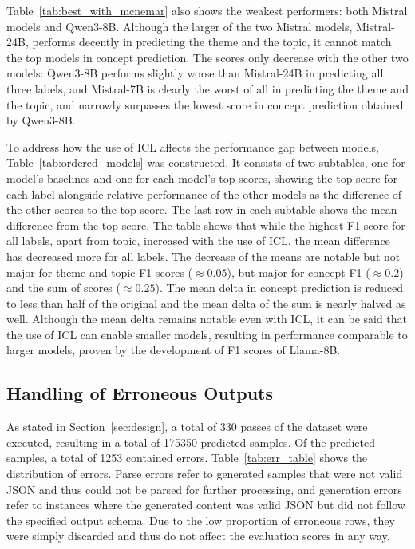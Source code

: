 \documentclass[english, 12pt, a4paper, sci, utf8, a-2b, online]{latex/definitions/aaltothesis}
\begin{document}
Table~\ref{tab:best_with_mcnemar} also shows the weakest performers: both Mistral models and Qwen3-8B. Although the larger of the two Mistral models, Mistral-24B, performs decently in predicting the theme and the topic, it cannot match the top models in concept prediction. The scores only decrease with the other two models: Qwen3-8B performs slightly worse than Mistral-24B in predicting all three labels, and Mistral-7B is clearly the worst of all in predicting the theme and the topic, and narrowly surpasses the lowest score in concept prediction obtained by Qwen3-8B.

To address how the use of ICL affects the performance gap between models, Table~\ref{tab:ordered_models} was constructed. It consists of two subtables, one for model's baselines and one for each model's top scores, showing the top score for each label alongside relative performance of the other models as the difference of the other scores to the top score. The last row in each subtable shows the mean difference from the top score. The table shows that while the highest F1 score for all labels, apart from topic, increased with the use of ICL, the mean difference has decreased more for all labels. The decrease of the means are notable but not major for theme and topic F1 scores ($\approx 0.05$), but major for concept F1 ($\approx 0.2$) and the sum of scores ($\approx 0.25$). The mean delta in concept prediction is reduced to less than half of the original and the mean delta of the sum is nearly halved as well. Although the mean delta remains notable even with ICL, it can be said that the use of ICL can enable smaller models, resulting in performance comparable to larger models, proven by the development of F1 scores of Llama-8B.

\subsection{Handling of Erroneous Outputs}

As stated in Section~\ref{sec:design}, a total of 330 passes of the dataset were executed, resulting in a total of 175350 predicted samples. Of the predicted samples, a total of 1253 contained errors. Table~\ref{tab:err_table} shows the distribution of errors. Parse errors refer to generated samples that were not valid JSON and thus could not be parsed for further processing, and generation errors refer to instances where the generated content was valid JSON but did not follow the specified output schema. Due to the low proportion of erroneous rows, they were simply discarded and thus do not affect the evaluation scores in any way.
\end{document}
